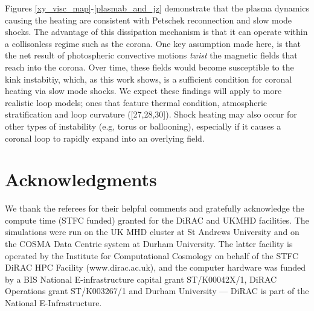 \documentclass{./packages/rs/rsproca}
\begin{document}
Figures \ref{xy_visc_map}-\ref{plasmab_and_jz} demonstrate that the plasma dynamics causing the heating are consistent with Petschek reconnection and slow mode shocks. The advantage of this dissipation mechanism is that it can operate within a collisonless regime such as the corona. One key assumption made here, is that the net result of photospheric convective motions \textit{twist} the magnetic fields that reach into the corona. Over time, these fields would become susceptible to the kink instabitiy, which, as this work shows, is a sufficient condition for coronal heating via slow mode shocks. We expect these findings will apply to more realistic loop models; ones that feature thermal condition, atmospheric stratification and loop curvature ([27,28,30]). Shock heating may also occur for other types of instability (e.g, torus or ballooning), especially if it causes a coronal loop to rapidly expand into an overlying field. 


\section*{Acknowledgments}

We thank the referees for their helpful comments and gratefully acknowledge the compute time (STFC funded) granted for the DiRAC and UKMHD facilities. The simulations were run on the UK MHD cluster at St Andrews University and on the COSMA Data Centric system at Durham University. The latter facility is operated by the Institute for Computational Cosmology on behalf of the STFC DiRAC HPC Facility (www.dirac.ac.uk), and the computer hardware was funded by a BIS National E-infrastructure capital grant ST/K00042X/1, DiRAC Operations grant ST/K003267/1 and Durham University --- DiRAC is part of the National E-Infrastructure.
\end{document}
